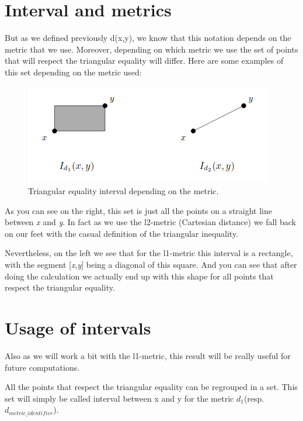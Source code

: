 \section{Interval and metrics} %
	But as we defined previously d(x,y), we know that this notation depends on the metric that we use. Moreover, depending on which metric we use the set of points that will respect the triangular equality will differ. Here are some examples of this set depending on the metric used:
\begin{figure}[H]
  \includegraphics[width=\linewidth]{img/interval_example.png}
  \caption{Triangular equality interval depending on the metric.}
  \label{fig:interval_example}
\end{figure}

As you can see on the right, this set is just all the points on a straight line between \emph{x} and \emph{y}. In fact as we use the l2-metric (Cartesian distance) we fall back on our feet with the casual definition of the triangular inequality.

Nevertheless, on the left we see that for the l1-metric this interval is a rectangle, with the segment [\emph{x},\emph{y}] being a diagonal of this square. And you can see that after doing the calculation we actually end up with this shape for all points that respect the triangular equality.

\section{Usage of intervals} %
Also as we will work a bit with the l1-metric, this result will be really useful for future computations.\newline

All the points that respect the triangular equality can be regrouped in a set. This set will simply be called interval between x and y for the metric $d_1$(resp. $d_{metric\_identifier}$).

